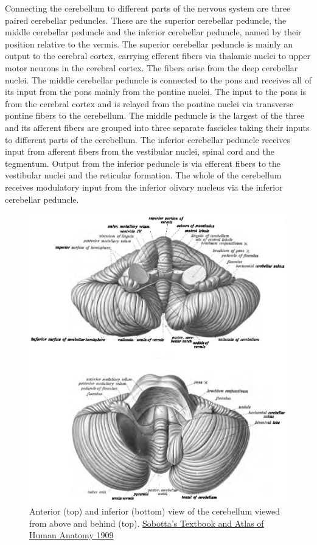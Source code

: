 Connecting the cerebellum to different parts of the nervous system are three paired cerebellar peduncles. These are the superior cerebellar peduncle, the middle cerebellar peduncle and the inferior cerebellar peduncle, named by their position relative to the vermis. The superior cerebellar peduncle is mainly an output to the cerebral cortex, carrying efferent fibers via thalamic nuclei to upper motor neurons in the cerebral cortex. The fibers arise from the deep cerebellar nuclei. The middle cerebellar peduncle is connected to the pons and receives all of its input from the pons mainly from the pontine nuclei. The input to the pons is from the cerebral cortex and is relayed from the pontine nuclei via transverse pontine fibers to the cerebellum. The middle peduncle is the largest of the three and its afferent fibers are grouped into three separate fascicles taking their inputs to different parts of the cerebellum. The inferior cerebellar peduncle receives input from afferent fibers from the vestibular nuclei, spinal cord and the tegmentum. Output from the inferior peduncle is via efferent fibers to the vestibular nuclei and the reticular formation. The whole of the cerebellum receives modulatory input from the inferior olivary nucleus via the inferior cerebellar peduncle.



\begin{figure}

{\centering \includegraphics[width=0.7\linewidth]{./figures/cns/Sobotta_1909_655} 

}

\caption{Anterior (top) and inferior (bottom) view of the cerebellum viewed from above and behind (top). \href{https://commons.wikimedia.org/wiki/File:Sobo_1909_655.png}{Sobotta's Textbook and Atlas of Human Anatomy 1909}}\label{fig:cerebellumanteriorinferior}
\end{figure}

